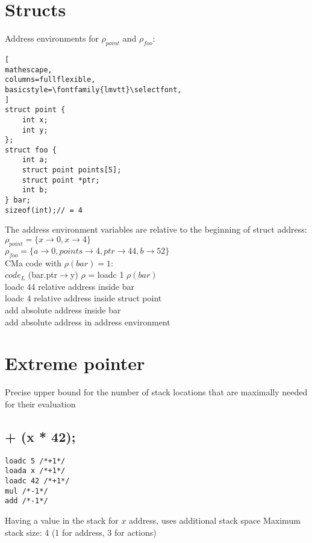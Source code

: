 \documentclass{report}
\begin{document}
\section{Structs}
Address environments for $\rho_{point}$ and $\rho_{foo}$:
\begin{lstlisting}[
mathescape,
columns=fullflexible,
basicstyle=\fontfamily{lmvtt}\selectfont,
]
struct point {
    int x;
    int y;
};
struct foo {
    int a;
    struct point points[5];
    struct point *ptr;
    int b;        
} bar;
sizeof(int);// = 4
\end{lstlisting}

The address environment variables are relative to the beginning of {\selectfont struct} address:\\
$\rho_{point} = \{x\to0, x\to4\}$\\
$\rho_{foo} = \{a\to0, points\to4, ptr\to44, b\to52\}$\\

CMa code with $\rho(bar) = 1$:\\
{\color{RoyalBlue}$code_L$} {\selectfont (bar.ptr$\to$y)} $\rho$ = loadc 1\hspace*{1.5cm} {\small $\rho(bar)$}\\
\hspace*{3.67cm} loadc 44\hspace*{1.3cm} {\small relative address inside {\selectfont bar}}\\
\hspace*{3.67cm} loadc 4\hspace*{1.5cm} {\small relative address inside {\selectfont struct point}}\\
\hspace*{3.67cm} add\hspace*{2cm} {\small absolute address inside {\selectfont bar}}\\
\hspace*{3.67cm} add\hspace*{2cm} {\small absolute address in address environment}\\

\section{Extreme pointer}
Precise upper bound for the number of stack locations that are maximally needed for their evaluation
\subsection{{ + (x * 42);}}
\begin{verbatim}
loadc 5 /*+1*/
loada x /*+1*/
loadc 42 /*+1*/
mul /*-1*/
add /*-1*/
\end{verbatim}
Having a value in the stack for $x$ address, uses additional stack space
Maximum stack size: 4 (1 for address, 3 for actions)
\end{document}
